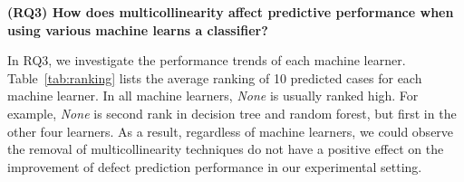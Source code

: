  
\noindent \textbf{(RQ3) How does multicollinearity affect predictive performance when using various machine learns a classifier?}
\label{secRQ3}
\newline

In RQ3, we investigate the performance trends of each machine learner. %
Table~\ref{tab:ranking} lists the average ranking of 10 predicted cases for each machine learner. In all machine learners, \emph{None} is usually ranked high. For example, \emph{None} is second rank in decision tree and random forest, but first in the other four learners. As a result, regardless of machine learners, we could observe the removal of multicollinearity techniques do not have a positive effect on the improvement of defect prediction performance in our experimental setting. 




